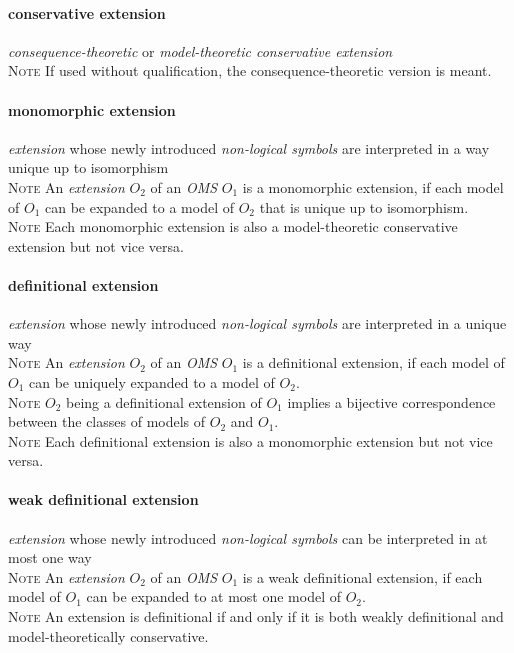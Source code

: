\documentclass[10pt,%
\ifpretendfinal
final%
\else
draft%
\fi,
]{scrreprt}
\newcommand*{\termref}[1]{\textit{#1}}
\newcommand{\termdefinition}[2]{\paragraph{#1} #2}
\newenvironment{definitions}[0]{\medskip }{}
\newenvironment{note}[0]{\ \\ \textsc{Note} \quad}{}
\begin{document}
\begin{definitions}
  \termdefinition{conservative extension}{\termref{consequence-theoretic} or \termref{model-theoretic conservative extension}}
  \begin{note}
   If used without qualification, the consequence-theoretic version is meant.
  \end{note}

  \termdefinition{monomorphic extension}{\termref{extension} whose newly introduced
   \termref{non-logical symbols} are interpreted in a way unique up to isomorphism}
  \begin{note}
An \termref{extension} $O_2$ of an \termref{OMS} $O_1$ is a monomorphic extension, if each model of $O_1$ can be expanded to a model of $O_2$ that is unique up to isomorphism.
  \end{note}
  \begin{note}
    Each monomorphic extension is also a model-theoretic conservative extension but not vice versa.
  \end{note}

  \termdefinition{definitional extension}{\termref{extension} whose newly introduced
   \termref{non-logical symbols} are interpreted in a unique way}
  \begin{note}
An \termref{extension} $O_2$ of an \termref{OMS} $O_1$ is a definitional extension, if each model of $O_1$ can be uniquely expanded to a model of $O_2$.
  \end{note}
  \begin{note}
    $O_2$ being a definitional extension of $O_1$ implies a bijective correspondence between the classes of models of $O_2$ and $O_1$.
  \end{note}
  \begin{note}
    Each definitional extension is also a monomorphic extension but not vice versa.
  \end{note}

  \termdefinition{weak definitional extension}{\termref{extension} whose newly introduced
   \termref{non-logical symbols} can be interpreted in at most one way}
  \begin{note}
An \termref{extension} $O_2$ of an \termref{OMS} $O_1$ is a weak definitional extension, if each model of $O_1$ can be expanded to at most one model of $O_2$.
  \end{note}
  \begin{note}
    An extension is definitional if and only if it is both weakly definitional
   and model-theoretically conservative.
  \end{note}


\end{definitions}
\end{document}
